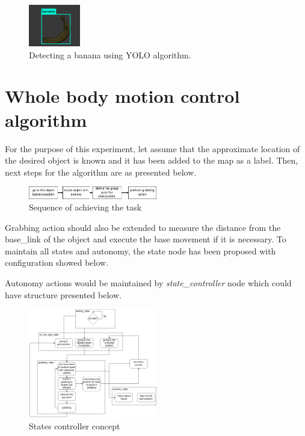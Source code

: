 \documentclass[conference,a4paper]{IEEEtran}
\begin{document}
\begin{figure}[!ht]
  \centering
  \includegraphics[width=0.2\textwidth]{img/Yolo_banana.jpeg}
  \caption{Detecting a banana using YOLO algorithm.}
\end{figure}

\section{Whole body motion control algorithm}
For the purpose of this experiment, let assume that the approximate location of the desired object is known and it has been added to the map as a label. Then, next steps for the algorithm are as presented below.

\begin{figure}[ht]
  \centering
  \includegraphics[width=0.5\textwidth]{img/algorithm_no_problem1.png}
  \caption{Sequence of achieving the task}
\end{figure}

Grabbing action should also be extended to measure the distance from the base\_link of the object and execute the base movement if it is necessary. To maintain all states and autonomy, the state node has been proposed with configuration showed below.

Autonomy actions would be maintained by \textit{state\_controller} node which could have structure presented below.
\begin{figure}[ht]
  \centering
  \includegraphics[width=0.5\textwidth]{img/states.png}
  \caption[states controller structure]{States controller concept}
\end{figure}
\FloatBarrier
\end{document}
